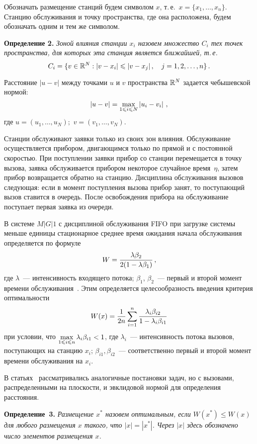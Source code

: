 \begin{multicols}{2}
Обозначать размещение станций будем символом $x$, т.\,е.\ $x=\{x_1,\ldots,x_n\}$. Станцию
обслуживания и точку пространства, где она расположена, будем обозначать одним и тем же
символом.

\noindent
\textbf{Определение 2.} \textit{Зоной влияния станции $x_i$ назовем множество $C_i$ тех точек
пространства, для которых эта станция является ближайшей, т.\,е.}
$$
C_i=\{v\in{\mathbb{R}}^N:|v-x_i|\leqslant|v-x_j|\,,\quad j=1,2,\ldots,n\}\,.
$$

Расстояние $|u-v|$ между точками $u$ и $v$ пространства ${\mathbb{R}}^N$ задается чебышевской нормой:
$$ %
\vert u- v\vert =\maxl{1\leqslant i\leqslant N}\left|u_i-v_i\right|\,,
$$
где $u=(u_1,\ldots,u_N);$ $v=(v_1,\ldots,v_N)$.

Станции обслуживают заявки только из своих зон влияния. Обслуживание осуществляется прибором,
двигающимся только по прямой и с постоянной скоростью. При поступлении заявки прибор со
станции перемещается в точку вызова, заявка обслуживается прибором некоторое случайное время~$\eta$,
затем прибор возвращается обратно на станцию. Дисциплина обслуживания вызовов
следующая: если в момент поступления вызова прибор занят, то поступающий вызов ставится в
очередь. После освобождения прибора на обслуживание поступает первая заявка из очереди.

В системе $M\vert G\vert 1$ с дисциплиной обслуживания FIFO при загрузке системы меньше единицы
стационарное среднее время ожидания начала обслуживания определяется по формуле
$$
W=\displaystyle\frac{\displaystyle \lambda\beta_2\mathstrut}{\displaystyle 2(1-\lambda\beta_1)\mathstrut}\,,
$$
где $\lambda$~--- интенсивность входящего потока; $\beta_1$, $\beta_2$~--- первый и второй
момент времени обслуживания~\cite{1za}. Этим определяется целесообразность введения критерия
оптимальности
$$
W(x)=\displaystyle\frac{\displaystyle 1\mathstrut}{\displaystyle 2n\mathstrut}\sum\limits_{i=1}^{n}\displaystyle\frac{\displaystyle \lambda_i\beta_{i2}\mathstrut}{\displaystyle 1-\lambda_i\beta_{i1}\mathstrut}
$$
при условии, что $\max\limits_{1\leqslant i\leqslant n} \lambda_i \beta_{i1}< 1 $, где
$\lambda_i$~--- интенсивность потока вызовов, поступающих на станцию $x_i$;
$\beta_{i1},\beta_{i2}$~--- соответственно первый и второй момент времени обслуживания на
$x_i$.

В статьях~\cite{2za, 3za} рассматривались аналогичные постановки задач, но с вызовами,
распределенными на плоскости, и эвклидовой нормой для определения расстояния.

\noindent
\textbf{Определение~3.} \textit{Размещение $x^*$ назовем оптимальным, если $W(x^*)\leqslant W(x)$ для
любого размещения $x$ такого, что $|x|=|x^*|$. Через $|x|$ здесь обозначено число элементов
размещения $x$.}


\end{multicols}
